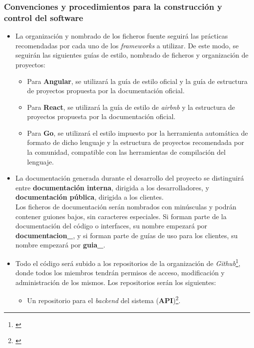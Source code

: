 \documentclass[11pt, a4paper, titlepage]{article}
\begin{document}
\subsubsection{Convenciones y procedimientos para la construcción y control del software}

\begin{itemize}
    \item La organización y nombrado de los ficheros fuente seguirá las prácticas recomendadas por cada uno de los \textit{frameworks} a utilizar. De este modo, se seguirán las siguientes guías de estilo, nombrado de ficheros y organización de proyectos:
    \begin{itemize}
        \item Para \textbf{Angular}, se utilizará la guía de estilo oficial\cite{estiloangular} y la guía de estructura de proyectos propuesta por la documentación oficial\cite{estructuraangular}.

        \item Para \textbf{React}, se utilizará la
        guía de estilo de \textit{airbnb}\cite{estiloreact} y la estructura de proyectos propuesta por la documentación oficial\cite{estructurareact}.

        \item Para \textbf{Go}, se utilizará el estilo impuesto por la herramienta automática de formato de dicho lenguaje\cite{estilogolang} y la estructura de proyectos recomendada por la comunidad\cite{estructuragolang}, compatible con las herramientas de compilación del lenguaje.
    \end{itemize}

    \item La documentación generada durante el desarrollo del proyecto se distinguirá entre \textbf{documentación interna}, dirigida a los desarrolladores, y \textbf{documentación pública}, dirigida a los clientes.\\

    Los ficheros de documentación serán nombrados con minúsculas y podrán contener guiones bajos, sin caracteres especiales. Si forman parte de la documentación del código o interfaces, su nombre empezará por \textbf{documentacion\_}, y si forman parte de guías de uso para los clientes, su nombre empezará por \textbf{guia\_}.

    \item Todo el código será subido a los repositorios de la organización de \textit{Github}\footnote{\href{https://github.com/UNIZAR-30226-2022-01}{}}, donde todos los miembros tendrán permisos de acceso, modificación y administración de los mismos. Los repositorios serán los siguientes:
    \begin{itemize}
        \item Un repositorio para el \textit{backend} del sistema (\textbf{API})\footnote{\href{https://github.com/UNIZAR-30226-2022-01/proyecto_software_backend}{}}.


\end{itemize}
\end{itemize}
\end{document}
